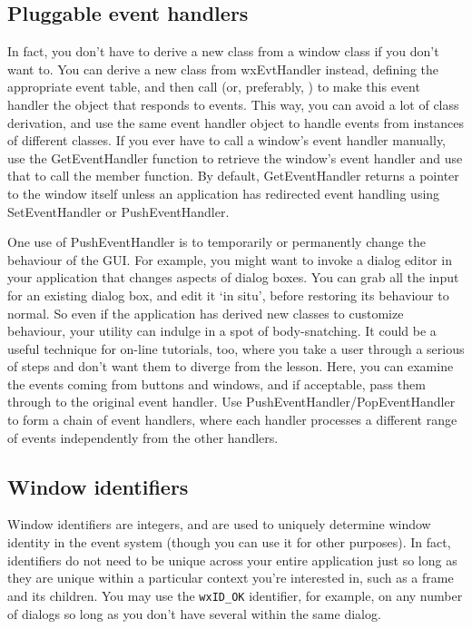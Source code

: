 \subsection{Pluggable event handlers}\label{pluggablehandlers}

In fact, you don't have to derive a new class from a window class
if you don't want to. You can derive a new class from wxEvtHandler instead,
defining the appropriate event table, and then call
\rtfsp{} (or, preferably,
\rtfsp{}) to make this
event handler the object that responds to events. This way, you can avoid
a lot of class derivation, and use the same event handler object to
handle events from instances of different classes. If you ever have to call a window's event handler
manually, use the GetEventHandler function to retrieve the window's event handler and use that
to call the member function. By default, GetEventHandler returns a pointer to the window itself
unless an application has redirected event handling using SetEventHandler or PushEventHandler.

One use of PushEventHandler is to temporarily or permanently change the
behaviour of the GUI. For example, you might want to invoke a dialog editor
in your application that changes aspects of dialog boxes. You can
grab all the input for an existing dialog box, and edit it `in situ',
before restoring its behaviour to normal. So even if the application
has derived new classes to customize behaviour, your utility can indulge
in a spot of body-snatching. It could be a useful technique for on-line
tutorials, too, where you take a user through a serious of steps and
don't want them to diverge from the lesson. Here, you can examine the events
coming from buttons and windows, and if acceptable, pass them through to
the original event handler. Use PushEventHandler/PopEventHandler
to form a chain of event handlers, where each handler processes a different
range of events independently from the other handlers.

\subsection{Window identifiers}\label{windowids}

Window identifiers are integers, and are used to
uniquely determine window identity in the event system (though you can use it
for other purposes). In fact, identifiers do not need to be unique
across your entire application just so long as they are unique within a
particular context you're interested in, such as a frame and its children. You
may use the {\tt wxID\_OK} identifier, for example, on any number of dialogs so
long as you don't have several within the same dialog.


